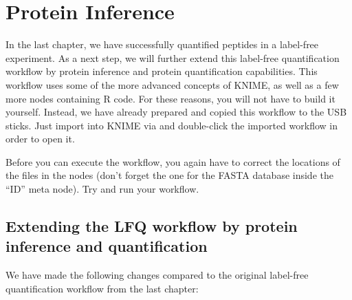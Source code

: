 \section{Protein Inference}

In the last chapter, we have successfully quantified peptides in a label-free experiment. As a next step, we will
further extend this label-free quantification workflow by protein inference and protein quantification capabilities.
This workflow uses some of the more advanced concepts of KNIME, as well as a few more nodes containing R code.
For these reasons, you will not have to build it yourself. Instead, we have already
prepared and copied this workflow to the USB sticks. Just import  into KNIME
via  and double-click the imported workflow in order to open it.

Before you can execute the workflow, you again have to correct the locations of the files in the  nodes (don't forget
the one for the FASTA database inside the ``ID'' meta node). Try and run your workflow.

\subsection{Extending the LFQ workflow by protein inference and quantification}

We have made the following changes compared to the original label-free quantification workflow from the last chapter:

